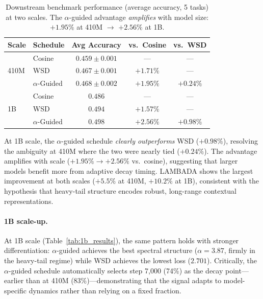 \begin{table}[t]
\centering
\small
\caption{Downstream benchmark performance (average accuracy, 5 tasks) at two scales. The $\alpha$-guided advantage \emph{amplifies} with model size: $+1.95\%$ at 410M $\to$ $+2.56\%$ at 1B.}
\label{tab:downstream}
\begin{tabular}{@{}llccc@{}}
\toprule
\textbf{Scale} & \textbf{Schedule} & \textbf{Avg Accuracy} & \textbf{vs.\ Cosine} & \textbf{vs.\ WSD} \\
\midrule
\multirow{3}{*}{410M} & Cosine & $0.459 \pm 0.001$ & --- & --- \\
& WSD & $0.467 \pm 0.001$ & $+1.71\%$ & --- \\
& $\alpha$-Guided & $0.468 \pm 0.002$ & $+1.95\%$ & $+0.24\%$ \\
\midrule
\multirow{3}{*}{1B} & Cosine & $0.486$ & --- & --- \\
& WSD & $0.494$ & $+1.57\%$ & --- \\
& $\alpha$-Guided & $\mathbf{0.498}$ & $\mathbf{+2.56\%}$ & $\mathbf{+0.98\%}$ \\
\bottomrule
\end{tabular}
\end{table}

At 1B scale, the $\alpha$-guided schedule \emph{clearly outperforms} WSD ($+0.98\%$), resolving the ambiguity at 410M where the two were nearly tied ($+0.24\%$). The advantage amplifies with scale ($+1.95\% \to +2.56\%$ vs.\ cosine), suggesting that larger models benefit more from adaptive decay timing. LAMBADA shows the largest improvement at both scales ($+5.5\%$ at 410M, $+10.2\%$ at 1B), consistent with the hypothesis that heavy-tail structure encodes robust, long-range contextual representations.

\paragraph{1B scale-up.} At 1B scale (Table~\ref{tab:1b_results}), the same pattern holds with stronger differentiation: $\alpha$-guided achieves the best spectral structure ($\alpha = 3.87$, firmly in the heavy-tail regime) while WSD achieves the lowest loss ($2.701$). Critically, the $\alpha$-guided schedule automatically selects step 7{,}000 (74\%) as the decay point---earlier than at 410M (83\%)---demonstrating that the signal adapts to model-specific dynamics rather than relying on a fixed fraction.

